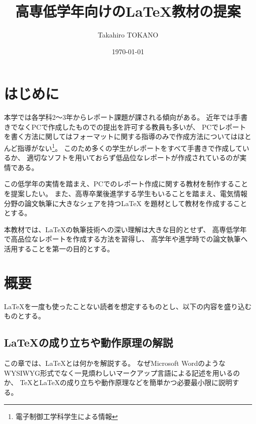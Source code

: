 \documentclass[uplatex]{jsarticle}
\title{高専低学年向けの\LaTeX 教材の提案}
\author{Takahiro TOKANO}
\date{\today}
\begin{document}
\maketitle

\section{はじめに}
	本学では各学科2～3年からレポート課題が課される傾向がある。
	近年では手書きでなくPCで作成したものでの提出を許可する教員も多いが、
	PCでレポートを書く方法に関してはフォーマットに関する指導のみで作成方法についてはほとんど指導がない\footnote{電子制御工学科学生による情報}。
	このため多くの学生がレポートをすべて手書きで作成しているか、
	適切なソフトを用いておらず低品位なレポートが作成されているのが実情である。

	この低学年の実情を踏まえ、PCでのレポート作成に関する教材を制作することを提案したい。
	また、高専卒業後進学する学生もいることを踏まえ、電気情報分野の論文執筆に大きなシェアを持つ\LaTeX
	を題材として教材を作成することとする。

	本教材では、\LaTeX の執筆技術への深い理解は大きな目的とせず、
	高専低学年で高品位なレポートを作成する方法を習得し、
	高学年や進学時での論文執筆へ活用することを第一の目的とする。

\section{概要}
	\LaTeX を一度も使ったことない読者を想定するものとし、以下の内容を盛り込むものとする。


	\subsection{\LaTeX の成り立ちや動作原理の解説}
		この章では、\LaTeX とは何かを解説する。
		なぜMicrosoft WordのようなWYSIWYG形式でなく一見煩わしいマークアップ言語による記述を用いるのか、
		\TeX と\LaTeX の成り立ちや動作原理などを簡単かつ必要最小限に説明する。
\end{document}
